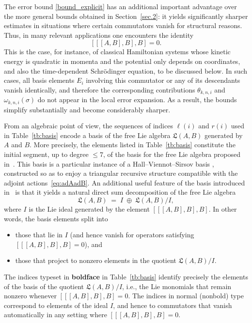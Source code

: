 \documentclass[11pt]{article}
\begin{document}
The error bound \eqref{bound_explicit} has an additional important advantage over the more general 
bounds obtained in Section~\ref{sec.2}: it yields significantly sharper estimates in 
situations where certain commutators vanish for structural reasons.  Thus,
in many relevant applications one encounters the identity
\begin{equation} \label{rkn_1}
   [[[A,B],B],B] = 0.
\end{equation}
This is the case, for instance, of classical Hamiltonian systems whose kinetic energy is quadratic in momenta and the potential
only depends on coordinates, and also the time-dependent Schr\"odinger equation, to be discussed below.
In such cases, all basis elements $E_i$ involving this 
commutator or any of its descendants vanish identically, and therefore the 
corresponding contributions $\theta_{k,n,i}$ and $\omega_{k,n,i}(\sigma)$ do not 
appear in the local error expansion.  As a result, the bounds simplify 
substantially and become considerably sharper.

From an algebraic point of view,
the sequences of indices $\ell(i)$ and $r(i)$ used in Table~\ref{tb:basis} 
encode a basis of the free Lie algebra $\mathfrak{L}(A,B)$ generated by $A$ and $B$.  
More precisely, the elements listed in Table~\ref{tb:basis} constitute the 
initial segment, up to degree $\le 7$, of the basis for the free Lie algebra 
proposed in~\cite{mclachlan19tla}.  
This basis is a particular instance of a Hall--Viennot--Sirsov basis 
\cite{viennot78adl,reutenauer93fla}, constructed so as to enjoy a triangular recursive 
structure compatible with the adjoint actions~\eqref{eq:adAadB}.  
An additional useful feature of the basis introduced in~\cite{mclachlan19tla} is that it yields a natural direct 
sum decomposition of the free Lie algebra
\[
   \mathfrak{L}(A,B) \;=\; I \;\oplus\; \mathfrak{L}(A,B) / I,
\]
where $I$ is the Lie ideal generated by the element $[[[A,B],B],B]$.  
In other words, the basis elements split into
\begin{itemize}
   \item those that lie in $I$ (and hence vanish for operators satisfying 
         $[[[A,B],B],B]=0$), and
   \item those that project to nonzero elements in the quotient 
         $\mathfrak{L}(A,B)/I$.
\end{itemize}

The indices typeset in \textbf{boldface} in Table~\ref{tb:basis} identify 
precisely the elements of the basis of the quotient $\mathfrak{L}(A,B)/I$, 
i.e., the Lie monomials that remain nonzero whenever $[[[A,B],B],B]= 0$.  
The indices in normal (nonbold) type correspond to elements of the ideal $I$, 
and hence to commutators that vanish automatically in any setting where 
$[[[A,B],B],B]=0$.  
\end{document}

